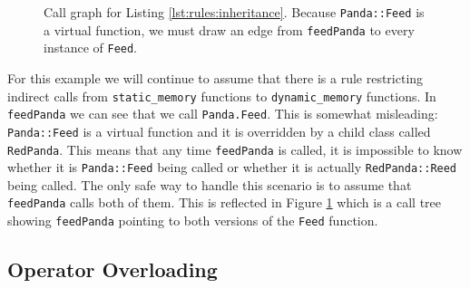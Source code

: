 \begin{figure}
    \centering
    \caption{Call graph for Listing \ref{lst:rules:inheritance}.  Because \lstinline{Panda::Feed} is a virtual function, we must draw an edge from \lstinline{feedPanda} to every instance of \lstinline{Feed}.}
    \label{fig:rules:inheritance}
\end{figure}

For this example we will continue to assume that there is a rule restricting indirect calls from \lstinline{static_memory} functions to \lstinline{dynamic_memory} functions.  In \lstinline{feedPanda} we can see that we call \lstinline{Panda.Feed}.  This is somewhat misleading:  \lstinline{Panda::Feed} is a virtual function and it is overridden by a child class called \lstinline{RedPanda}.  This means that any time \lstinline{feedPanda} is called, it is impossible to know whether it is \lstinline{Panda::Feed} being called or whether it is actually \lstinline{RedPanda::Reed} being called.  The only safe way to handle this scenario is to assume that \lstinline{feedPanda} calls both of them.  This is reflected in Figure \ref{fig:rules:inheritance} which is a call tree showing \lstinline{feedPanda} pointing to both versions of the \lstinline{Feed} function.  

\subsection{Operator Overloading}

